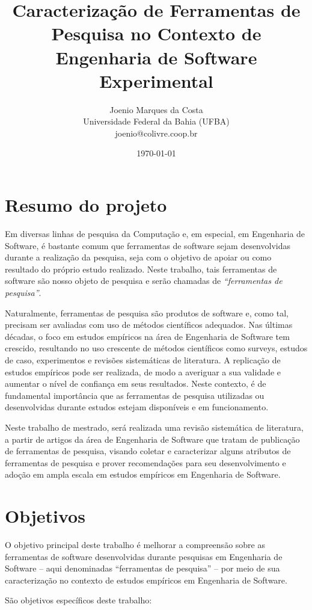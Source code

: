 \documentclass[12pt]{article}
\title{
  Caracterização de Ferramentas de Pesquisa no Contexto de Engenharia de
  Software Experimental
}
\author{Joenio Marques da Costa\\
  {\small Universidade Federal da Bahia (UFBA)} \\
  {\small joenio@colivre.coop.br}
}
\date{\today}
\begin{document}
\maketitle

\section{Resumo do projeto}

Em diversas linhas de pesquisa da Computação e, em especial, em Engenharia de
Software, é bastante comum que ferramentas de software sejam desenvolvidas
durante a realização da pesquisa, seja com o objetivo de apoiar ou como
resultado do próprio estudo realizado. Neste trabalho, tais ferramentas de
software são nosso objeto de pesquisa e serão chamadas de {\it “ferramentas de
pesquisa”}.

Naturalmente, ferramentas de pesquisa são produtos de software e, como tal,
precisam ser avaliadas com uso de métodos científicos adequados. Nas últimas
décadas, o foco em estudos empíricos na área de Engenharia de Software tem
crescido, resultando no uso crescente de métodos científicos como surveys,
estudos de caso, experimentos e revisões sistemáticas de literatura. A
replicação de estudos empíricos pode ser realizada, de modo a averiguar a sua
validade e aumentar o nível de confiança em seus resultados. Neste contexto, é
de fundamental importância que as ferramentas de pesquisa utilizadas ou
desenvolvidas durante estudos estejam disponíveis e em funcionamento.

Neste trabalho de mestrado, será realizada uma revisão sistemática de
literatura, a partir de artigos da área de Engenharia de Software que tratam
de publicação de ferramentas de pesquisa, visando coletar e caracterizar
alguns atributos de ferramentas de pesquisa e prover recomendações para seu
desenvolvimento e adoção em ampla escala em estudos empíricos em Engenharia de
Software.

\section{Objetivos}

O objetivo principal deste trabalho é melhorar a compreensão sobre as
ferramentas de software desenvolvidas durante pesquisas em Engenharia de
Software -- aqui denominadas “ferramentas de pesquisa” -- por meio de sua
caracterização no contexto de estudos empíricos em Engenharia de Software. 

São objetivos específicos deste trabalho:
\end{document}
